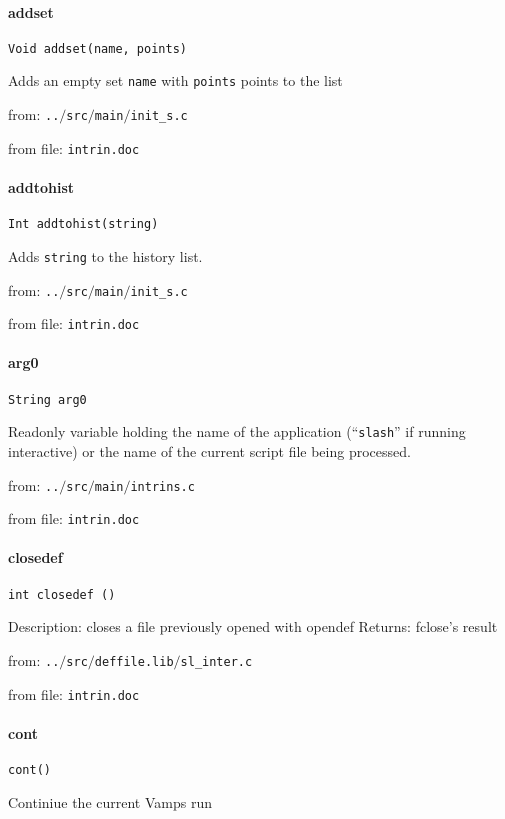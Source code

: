 \paragraph{addset}
\begin{verbatim}
Void addset(name, points)
\end{verbatim}
Adds an empty set {\tt name} with {\tt points} points
to the list


from: {\tt ..$/$src$/$main$/$init\_s.c}

from file: {\tt intrin.doc}


\paragraph{addtohist}
\begin{verbatim}
Int addtohist(string)
\end{verbatim}
Adds {\tt string} to the history list.


from: {\tt ..$/$src$/$main$/$init\_s.c}

from file: {\tt intrin.doc}


\paragraph{arg0}
\begin{verbatim}
String arg0
\end{verbatim}
Readonly variable holding the name of the application
(``{\tt slash}'' if running interactive) or the name of the
current script file being processed.


from: {\tt ..$/$src$/$main$/$intrins.c}

from file: {\tt intrin.doc}


\paragraph{closedef}
\begin{verbatim}
int closedef ()
\end{verbatim}
Description: closes a file previously opened with opendef
Returns: fclose's result


from: {\tt ..$/$src$/$deffile.lib$/$sl\_inter.c}

from file: {\tt intrin.doc}


\paragraph{cont}
\begin{verbatim}
cont()
\end{verbatim}
Continiue the current Vamps run 


